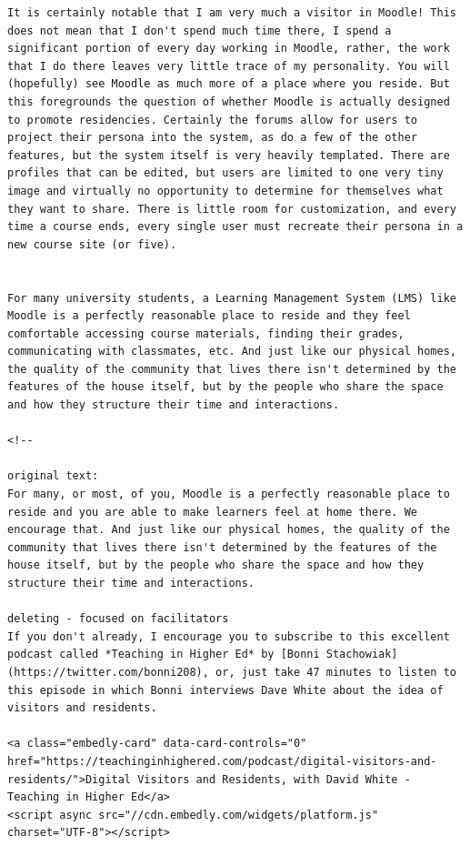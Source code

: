\documentclass[
]{book}
\theoremstyle{definition}
\theoremstyle{definition}
\theoremstyle{definition}
\theoremstyle{definition}
\theoremstyle{remark}
\begin{document}
\begin{verbatim}
It is certainly notable that I am very much a visitor in Moodle! This does not mean that I don't spend much time there, I spend a significant portion of every day working in Moodle, rather, the work that I do there leaves very little trace of my personality. You will (hopefully) see Moodle as much more of a place where you reside. But this foregrounds the question of whether Moodle is actually designed to promote residencies. Certainly the forums allow for users to project their persona into the system, as do a few of the other features, but the system itself is very heavily templated. There are profiles that can be edited, but users are limited to one very tiny image and virtually no opportunity to determine for themselves what they want to share. There is little room for customization, and every time a course ends, every single user must recreate their persona in a new course site (or five).


For many university students, a Learning Management System (LMS) like Moodle is a perfectly reasonable place to reside and they feel comfortable accessing course materials, finding their grades, communicating with classmates, etc. And just like our physical homes, the quality of the community that lives there isn't determined by the features of the house itself, but by the people who share the space and how they structure their time and interactions.

<!--

original text:
For many, or most, of you, Moodle is a perfectly reasonable place to reside and you are able to make learners feel at home there. We encourage that. And just like our physical homes, the quality of the community that lives there isn't determined by the features of the house itself, but by the people who share the space and how they structure their time and interactions.

deleting - focused on facilitators
If you don't already, I encourage you to subscribe to this excellent podcast called *Teaching in Higher Ed* by [Bonni Stachowiak](https://twitter.com/bonni208), or, just take 47 minutes to listen to this episode in which Bonni interviews Dave White about the idea of visitors and residents.

<a class="embedly-card" data-card-controls="0" href="https://teachinginhighered.com/podcast/digital-visitors-and-residents/">Digital Visitors and Residents, with David White - Teaching in Higher Ed</a>
<script async src="//cdn.embedly.com/widgets/platform.js" charset="UTF-8"></script>


\end{verbatim}
\end{document}
